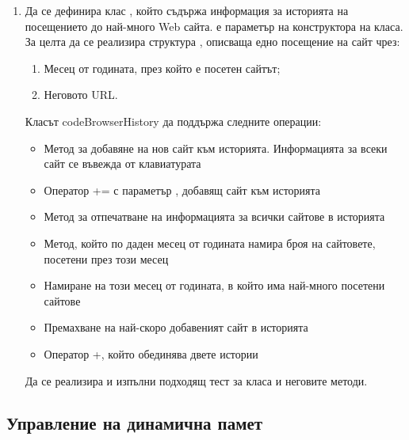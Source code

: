 \begin{enumerate}
\begin{lstlisting}
\end{lstlisting}



\item \label{zad:browser} Да се дефинира клас , който съдържа информация за историята на посещението до най-много  Web сайта.  е параметър на конструктора на класа. За целта да се реализира структура , описваща едно посещение на сайт чрез:

\begin{enumerate}[label=\alph*)]
	\item Месец от годината, през който е посетен сайтът;
	\item Неговото URL.
\end{enumerate}

Класът code{BrowserHistory} да поддържа следните операции:
\begin{itemize}
\item Метод за добавяне на нов сайт към историята. Информацията за всеки сайт се въвежда от клавиатурата
\item Оператор += с параметър , добавящ сайт към историята
\item Метод за отпечатване на информацията за всички сайтове в историята
\item Метод, който по даден месец от годината намира броя на сайтовете, посетени през този месец
\item Намиране на този месец от годината, в който има най-много посетени сайтове
\item Премахване на най-скоро добавеният сайт в историята
\item Оператор +, който обединява двете истории
\end{itemize}

Да се реализира и изпълни подходящ тест за класа и неговите методи.

\end{enumerate}

\pagebreak

\subsection{Управление на динамична памет}

